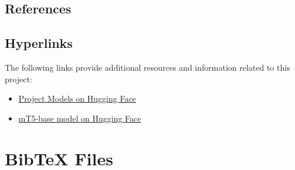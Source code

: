 \documentclass[11pt]{article}
\begin{document}
\subsection{References}


\subsection{Hyperlinks}
The following links provide additional resources and information related to this project:

\begin{itemize}
    \item \href{https://huggingface.co/hanspeterlyngsoeraaschoujensen}{Project Models on Hugging Face}\label{project_models_huggingface}
    \item \href{https://huggingface.co/google/mt5-base}{mT5-base model on Hugging Face}\label{mt5_base_model_huggingface}
\end{itemize}

\nocite{Ando2005,andrew2007scalable,rasooli-tetrault-2015, rajpurkar-etal-2018-know, hu2021loralowrankadaptationlarge, risch2021semanticanswersimilarityevaluating}
\section{Bib\TeX{} Files}
\label{sec:bibtex}

\end{document}
